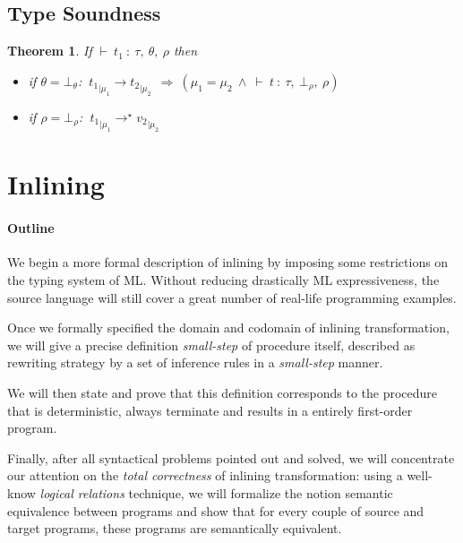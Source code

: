 \documentclass[a4paper,11pt,oneside]{article}
\theoremstyle{plain}
\newtheorem{theorem}[definition]{Theorem}
\newcommand{\bwedge}{\boldsymbol{~\wedge~}}
\newcommand{\brarr}{\boldsymbol{~\Rightarrow~}}
\newcommand{\typing}[4]{\vdash~#1~:~#2,~#3,~#4}
\newcommand{\bth}{\bot_\theta}
\newcommand{\brh}{\bot_\rho}
\newcommand{\evalstep}[4]{~#1_{|\mu_#2} \rightarrow #3_{|\mu_#4} ~}
\newcommand{\evalstar}[4]{~#1_{|\mu_#2} \rightarrow^{\star} #3_{|\mu_#4} ~}
\begin{document}
\subsection{Type Soundness}
\vspace*{-0.2cm}
\begin{theorem}
 If $\typing{t_1}{\tau}{\theta}{\rho}$ then 
 \begin{itemize}
 \item[$\bullet$] if $\theta = \bth$:
    $\evalstep{t{_1}}{1}{t{_2}}{2} \brarr (\mu_1 = \mu_2 \bwedge 
  \typing{t}{\tau}{\brh}{\rho})$
 \item[$\bullet$] if $\rho = \brh $: $\evalstar{t{_1}}{1}{v{_2}}{2}$

 
 \end{itemize}
 
\end{theorem}



\newpage
\section{Inlining}

\paragraph*{Outline}
 We begin a more formal description of inlining by imposing some
restrictions on the typing system of ML. Without reducing drastically ML
expressiveness, the source language will still cover a great number of real-life
programming examples.

Once we formally specified the domain and codomain of inlining transformation,
we will give a precise definition \textit{small-step} of procedure itself,
described as rewriting strategy by a set of inference rules in a
\textit{small-step} manner.

We will then state and prove that this definition corresponds to the procedure
that is deterministic, always terminate and results in a entirely first-order
program.

Finally, after all syntactical problems pointed out and solved, we will
concentrate our attention on the \textit{total correctness} of inlining
transformation: using a well-know \textit{logical relations} technique, we will
formalize the notion semantic equivalence between programs and show that for
every couple of source and target programs, these programs are semantically
equivalent.
 
\end{document}
